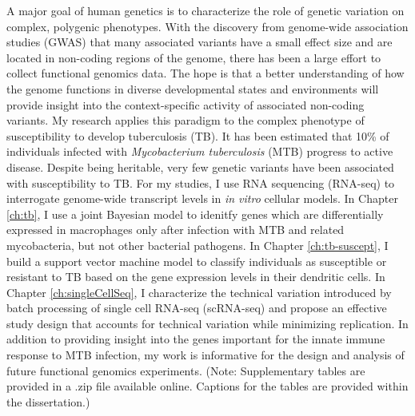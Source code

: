\abstract
A major goal of human genetics is to characterize the role of genetic
variation on complex, polygenic phenotypes. With the discovery from
genome-wide association studies (GWAS) that many associated variants
have a small effect size and are located in non-coding regions of the
genome, there has been a large effort to collect functional genomics
data. The hope is that a better understanding of how the genome
functions in diverse developmental states and environments will
provide insight into the context-specific activity of associated
non-coding variants. My research applies this paradigm to the complex
phenotype of susceptibility to develop tuberculosis (TB). It has been
estimated that 10\% of individuals infected with \emph{Mycobacterium
tuberculosis} (MTB) progress to active disease. Despite being
heritable, very few genetic variants have been associated with
susceptibility to TB. For my studies, I use RNA sequencing (RNA-seq)
to interrogate genome-wide transcript levels in \emph{in vitro}
cellular models. In Chapter \ref{ch:tb}, I use a joint Bayesian model
to idenitfy genes which are differentially expressed in macrophages
only after infection with MTB and related mycobacteria, but not other
bacterial pathogens. In Chapter \ref{ch:tb-suscept}, I build a support
vector machine model to classify individuals as susceptible or
resistant to TB based on the gene expression levels in their dendritic
cells. In Chapter \ref{ch:singleCellSeq}, I characterize the technical
variation introduced by batch processing of single cell RNA-seq
(scRNA-seq) and propose an effective study design that accounts for
technical variation while minimizing replication.  In addition to
providing insight into the genes important for the innate immune
response to MTB infection, my work is informative for the design and
analysis of future functional genomics experiments.  (Note:
Supplementary tables are provided in a .zip file available
online. Captions for the tables are provided within the dissertation.)
